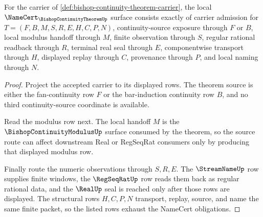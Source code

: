 \begin{theorem}
\label{thm:bishop-continuity-theorem-namecert-obligations}
For the carrier of \autoref{def:bishop-continuity-theorem-carrier}, the local $\NameCert_{\BishopContinuityTheoremUp}$ surface consists exactly of carrier admission for $T=(F,B,M,S,R,E,H,C,P,N)$, continuity-source exposure through $F$ or $B$, local modulus handoff through $M$, finite observation through $S$, regular rational readback through $R$, terminal real seal through $E$, componentwise transport through $H$, displayed replay through $C$, provenance through $P$, and local naming through $N$.
\end{theorem}
\begin{proof}
Project the accepted carrier to its displayed rows. The theorem source is either the fan-continuity row $F$ or the bar-induction continuity row $B$, and no third continuity-source coordinate is available.

Read the modulus row next. The local handoff $M$ is the $\BishopContinuityModulusUp$ surface consumed by the theorem, so the source route can affect downstream Real or RegSeqRat consumers only by producing that displayed modulus row.

Finally route the numeric observations through $S,R,E$. The $\StreamNameUp$ row supplies finite windows, the $\RegSeqRatUp$ row reads them back as regular rational data, and the $\RealUp$ seal is reached only after those rows are displayed. The structural rows $H,C,P,N$ transport, replay, source, and name the same finite packet, so the listed rows exhaust the NameCert obligations.
\end{proof}

